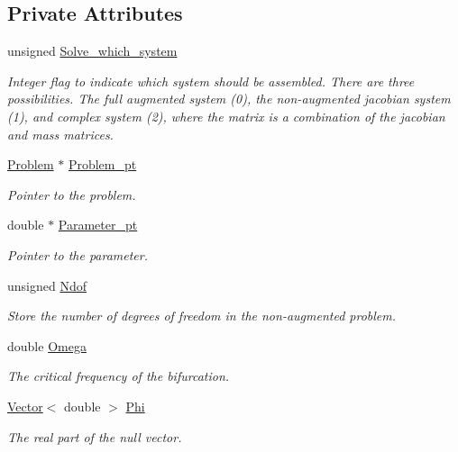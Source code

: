 \subsection*{Private Attributes}
\begin{DoxyCompactItemize}
\item 
unsigned \hyperlink{classoomph_1_1HopfHandler_aa3d4d806a328a460edaae915670edad3}{Solve\+\_\+which\+\_\+system}
\begin{DoxyCompactList}\small\item\em Integer flag to indicate which system should be assembled. There are three possibilities. The full augmented system (0), the non-\/augmented jacobian system (1), and complex system (2), where the matrix is a combination of the jacobian and mass matrices. \end{DoxyCompactList}\item 
\hyperlink{classoomph_1_1Problem}{Problem} $\ast$ \hyperlink{classoomph_1_1HopfHandler_aa4464f9abb45bad3222f748703c31155}{Problem\+\_\+pt}
\begin{DoxyCompactList}\small\item\em Pointer to the problem. \end{DoxyCompactList}\item 
double $\ast$ \hyperlink{classoomph_1_1HopfHandler_aff98f00728cd365d552229fec352f4e6}{Parameter\+\_\+pt}
\begin{DoxyCompactList}\small\item\em Pointer to the parameter. \end{DoxyCompactList}\item 
unsigned \hyperlink{classoomph_1_1HopfHandler_ac35b7c357ab453b686e80d8efe761945}{Ndof}
\begin{DoxyCompactList}\small\item\em Store the number of degrees of freedom in the non-\/augmented problem. \end{DoxyCompactList}\item 
double \hyperlink{classoomph_1_1HopfHandler_a1dc27019f4889918cd01207576eabaea}{Omega}
\begin{DoxyCompactList}\small\item\em The critical frequency of the bifurcation. \end{DoxyCompactList}\item 
\hyperlink{classoomph_1_1Vector}{Vector}$<$ double $>$ \hyperlink{classoomph_1_1HopfHandler_a117a5e192857e2f51c9c5d392fd6e5e7}{Phi}
\begin{DoxyCompactList}\small\item\em The real part of the null vector. \end{DoxyCompactList}\item 

\end{DoxyCompactItemize}
